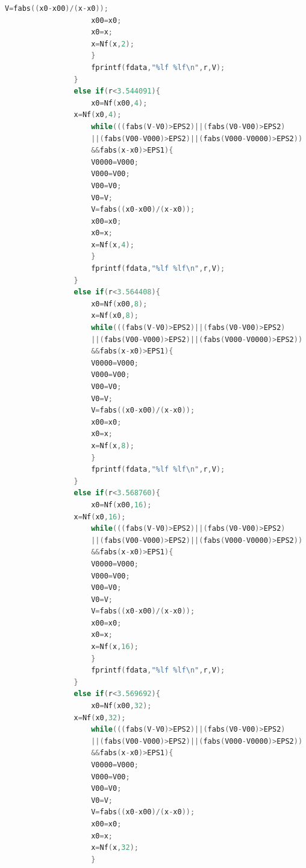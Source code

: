 \documentclass[10pt, a4paper]{article}
\begin{document}
\begin{lstlisting}[language=C]
                    V=fabs((x0-x00)/(x-x0));
                    x00=x0;
                    x0=x;
                    x=Nf(x,2);
                    }
                    fprintf(fdata,"%lf %lf\n",r,V); 
                }
                else if(r<3.544091){
                    x0=Nf(x00,4);
                x=Nf(x0,4);
                    while(((fabs(V-V0)>EPS2)||(fabs(V0-V00)>EPS2)
                    ||(fabs(V00-V000)>EPS2)||(fabs(V000-V0000)>EPS2))
                    &&fabs(x-x0)>EPS1){
                    V0000=V000;
                    V000=V00;
                    V00=V0;
                    V0=V;
                    V=fabs((x0-x00)/(x-x0));
                    x00=x0;
                    x0=x;
                    x=Nf(x,4);
                    }
                    fprintf(fdata,"%lf %lf\n",r,V); 
                }
                else if(r<3.564408){
                    x0=Nf(x00,8);
                    x=Nf(x0,8);
                    while(((fabs(V-V0)>EPS2)||(fabs(V0-V00)>EPS2)
                    ||(fabs(V00-V000)>EPS2)||(fabs(V000-V0000)>EPS2))
                    &&fabs(x-x0)>EPS1){
                    V0000=V000;
                    V000=V00;
                    V00=V0;
                    V0=V;
                    V=fabs((x0-x00)/(x-x0));
                    x00=x0;
                    x0=x;
                    x=Nf(x,8);
                    }
                    fprintf(fdata,"%lf %lf\n",r,V); 
                }
                else if(r<3.568760){
                    x0=Nf(x00,16);
                x=Nf(x0,16);
                    while(((fabs(V-V0)>EPS2)||(fabs(V0-V00)>EPS2)
                    ||(fabs(V00-V000)>EPS2)||(fabs(V000-V0000)>EPS2))
                    &&fabs(x-x0)>EPS1){
                    V0000=V000;
                    V000=V00;
                    V00=V0;
                    V0=V;
                    V=fabs((x0-x00)/(x-x0));
                    x00=x0;
                    x0=x;
                    x=Nf(x,16);
                    }
                    fprintf(fdata,"%lf %lf\n",r,V); 
                }
                else if(r<3.569692){
                    x0=Nf(x00,32);
                x=Nf(x0,32);
                    while(((fabs(V-V0)>EPS2)||(fabs(V0-V00)>EPS2)
                    ||(fabs(V00-V000)>EPS2)||(fabs(V000-V0000)>EPS2))
                    &&fabs(x-x0)>EPS1){
                    V0000=V000;
                    V000=V00;
                    V00=V0;
                    V0=V;
                    V=fabs((x0-x00)/(x-x0));
                    x00=x0;
                    x0=x;
                    x=Nf(x,32);
                    }

\end{lstlisting}
\end{document}
